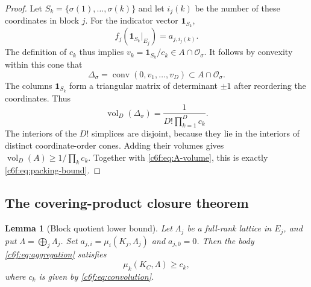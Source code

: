 \documentclass[11pt,a4paper]{article}
\newtheorem{lemma}[theorem]{Lemma}
\theoremstyle{remark}\newtheorem{remark}[theorem]{Remark}
\begin{document}
\begin{proof}
Let $S_k=\{\sigma(1),\ldots,\sigma(k)\}$ and let $i_j(k)$ be
the number of these coordinates in block $j$.  For the indicator
vector $\mathbf1_{S_k}$,
\[
 f_j(\mathbf1_{S_k}\vert_{E_j})=a_{j,i_j(k)}.
\]
The definition of $c_k$ thus implies
$v_k=\mathbf1_{S_k}/c_k\in A\cap\mathcal O_\sigma$.
It follows by convexity within this cone that
\[
 \Delta_\sigma=\operatorname{conv}(0,v_1,\ldots,v_D)
       \subset A\cap\mathcal O_\sigma.
\]
The columns $\mathbf1_{S_k}$ form a triangular matrix of
determinant $\pm1$ after reordering the coordinates.  Thus
\[
 \operatorname{vol}_D(\Delta_\sigma)
       =\frac1{D!\prod_{k=1}^D c_k}.
\]
The interiors of the $D!$ simplices are disjoint, because they lie
in the interiors of distinct coordinate-order cones.  Adding their
volumes gives $\operatorname{vol}_D(A)\ge1/\prod_kc_k$.
Together with \eqref{c6f:eq:A-volume}, this is exactly
\eqref{c6f:eq:packing-bound}.
\end{proof}

\subsection{The covering-product closure theorem}

\begin{lemma}[Block quotient lower bound]\label{c6f:lem:quotient}
Let $\Lambda_j$ be a full-rank lattice in $E_j$, and put
$\Lambda=\bigoplus_j\Lambda_j$.  Set
$a_{j,i}=\mu_i(K_j,\Lambda_j)$ and $a_{j,0}=0$.
Then the body \eqref{c6f:eq:aggregation} satisfies
\begin{equation}\label{c6f:eq:mu-lower}
 \mu_k(K_C,\Lambda)\ge c_k,
\end{equation}
where $c_k$ is given by \eqref{c6f:eq:convolution}.
\end{lemma}
\end{document}
